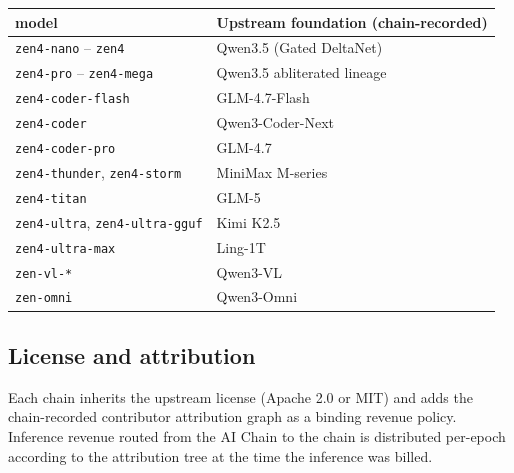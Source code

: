 \begin{longtable}{p{4cm}p{8cm}}
\toprule
\textbf{\Zen{} model} & \textbf{Upstream foundation (chain-recorded)} \\
\midrule
\endhead
\texttt{zen4-nano} -- \texttt{zen4} & Qwen3.5 (Gated DeltaNet) \\
\texttt{zen4-pro} -- \texttt{zen4-mega} & Qwen3.5 abliterated lineage \\
\texttt{zen4-coder-flash} & GLM-4.7-Flash \\
\texttt{zen4-coder} & Qwen3-Coder-Next \\
\texttt{zen4-coder-pro} & GLM-4.7 \\
\texttt{zen4-thunder}, \texttt{zen4-storm} & MiniMax M-series \\
\texttt{zen4-titan} & GLM-5 \\
\texttt{zen4-ultra}, \texttt{zen4-ultra-gguf} & Kimi K2.5 \\
\texttt{zen4-ultra-max} & Ling-1T \\
\texttt{zen-vl-*} & Qwen3-VL \\
\texttt{zen-omni} & Qwen3-Omni \\
\bottomrule
\end{longtable}

\subsection{License and attribution}

Each \Zen{} chain inherits the upstream license (Apache 2.0 or MIT) and adds the chain-recorded contributor attribution graph as a binding revenue policy. Inference revenue routed from the \Hanzo{} AI Chain to the \Zen{} chain is distributed per-epoch according to the attribution tree at the time the inference was billed.
